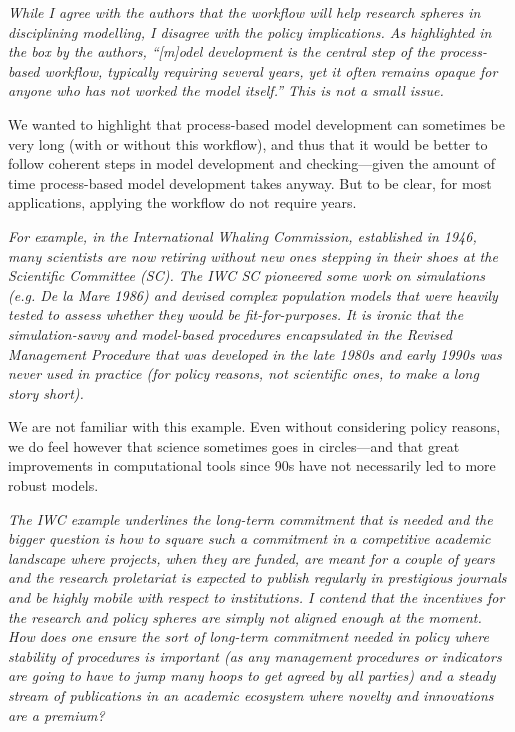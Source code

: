 \documentclass[11pt,letter]{article}
\begin{document}
\begin{mybox}
\emph{While I agree with the authors that the workflow will help research spheres in disciplining
modelling, I disagree with the policy implications. As highlighted in the box by the authors,
“[m]odel development is the central step of the process-based workflow, typically requiring
several years, yet it often remains opaque for anyone who has not worked the model itself.”
This is not a small issue.}  
\end{mybox}

We wanted to highlight that process-based model development can sometimes be very long (with or without this workflow), and thus that it would be better to follow coherent steps in model development and checking---given the amount of time process-based model development takes anyway. But to be clear, for most applications, applying the workflow do not require years.

\begin{mybox}
\emph{For example, in the International Whaling Commission, established in
1946, many scientists are now retiring without new ones stepping in their shoes at the Scientific
Committee (SC). The IWC SC pioneered some work on simulations (e.g. De la Mare 1986) and
devised complex population models that were heavily tested to assess whether they would be
fit-for-purposes. It is ironic that the simulation-savvy and model-based procedures
encapsulated in the Revised Management Procedure that was developed in the late 1980s and
early 1990s was never used in practice (for policy reasons, not scientific ones, to make a long
story short).}  
\end{mybox}

We are not familiar with this example. Even without considering policy reasons, we do feel however that science sometimes goes in circles---and that great improvements in computational tools since 90s have not necessarily led to more robust models. 

\begin{mybox}
\emph{The IWC example underlines the long-term commitment that is needed and the bigger
question is how to square such a commitment in a competitive academic landscape where
projects, when they are funded, are meant for a couple of years and the research proletariat is
expected to publish regularly in prestigious journals and be highly mobile with respect to
institutions. I contend that the incentives for the research and policy spheres are simply not
aligned enough at the moment. How does one ensure the sort of long-term commitment
needed in policy where stability of procedures is important (as any management procedures or
indicators are going to have to jump many hoops to get agreed by all parties) and a steady
stream of publications in an academic ecosystem where novelty and innovations are a
premium?}  
\end{mybox}
\end{document}
